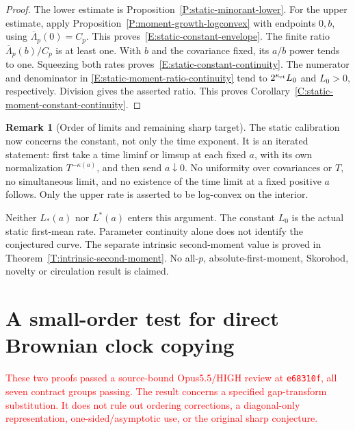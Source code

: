 \documentclass[12pt]{article}
\numberwithin{equation}{section}
\theoremstyle{definition}
\newtheorem{remark}[theorem]{Remark}
\newcommand{\myCmts}[1]{\begin{framed}\noindent\textcolor{red}{#1}\end{framed}}
\begin{document}
\begin{proof}
  The lower estimate is Proposition~\ref{P:static-minorant-lower}.
  For the upper estimate, apply Proposition~\ref{P:moment-growth-logconvex}
  with endpoints \(0,b\), using
  \(\overline\Lambda_p(0)=C_p\).
  This proves~\eqref{E:static-constant-envelope}.
  The finite ratio \(\overline\Lambda_p(b)/C_p\) is at least one.
  With \(b\) and the covariance fixed, its \(a/b\) power tends to one.
  Squeezing both rates proves~\eqref{E:static-constant-continuity}.
  The numerator and denominator in
  \eqref{E:static-moment-ratio-continuity} tend to
  \(2^{\kappa_{\rm st}}L_0\) and \(L_0>0\), respectively.
  Division gives the asserted ratio.
  This proves Corollary~\ref{C:static-moment-constant-continuity}.
\end{proof}

\begin{remark}[Order of limits and remaining sharp target]
  \label{R:temporal-type-scope}
  The static calibration now concerns the constant, not only the time
  exponent. It is an iterated statement: first take a time liminf or
  limsup at each fixed \(a\), with its own normalization
  \(T^{-\kappa(a)}\), and then send \(a\downarrow0\).
  No uniformity over covariances or \(T\), no simultaneous limit,
  and no existence of the time limit at a fixed positive \(a\) follows.
  Only the upper rate is asserted to be log-convex on the interior.

  Neither \(L_*(a)\) nor \(L^*(a)\) enters this argument.
  The constant \(L_0\) is the actual static first-mean rate.
  Parameter continuity alone does not identify the conjectured curve.
  The separate intrinsic second-moment value is proved in
  Theorem~\ref{T:intrinsic-second-moment}. No all-\(p\), absolute-first-moment,
  Skorohod, novelty or circulation result is claimed.
\end{remark}


\section{A small-order test for direct Brownian clock copying}
\label{S:two-clock-screen}

\myCmts{These two proofs passed a source-bound Opus5.5/HIGH review at
\texttt{e68310f}, all seven contract groups passing. The result concerns a
specified gap-transform substitution. It does not rule out ordering
corrections, a diagonal-only representation, one-sided/asymptotic use,
or the original sharp conjecture.}
\end{document}
